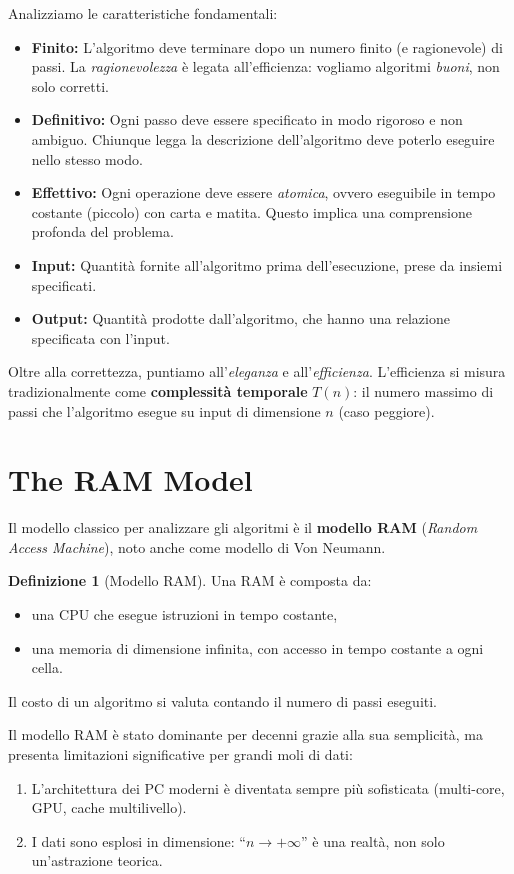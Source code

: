 \documentclass[12pt, a4paper, oneside]{book}
\theoremstyle{plain}
\theoremstyle{definition}
\newtheorem{definizione}[teorema]{Definizione}
\theoremstyle{remark}
\begin{document}
Analizziamo le caratteristiche fondamentali:
\begin{itemize}
  \item \textbf{Finito:} L'algoritmo deve terminare dopo un numero finito (e ragionevole) di passi. La \emph{ragionevolezza} è legata all'efficienza: vogliamo algoritmi \emph{buoni}, non solo corretti.
  \item \textbf{Definitivo:} Ogni passo deve essere specificato in modo rigoroso e non ambiguo. Chiunque legga la descrizione dell'algoritmo deve poterlo eseguire nello stesso modo.
  \item \textbf{Effettivo:} Ogni operazione deve essere \emph{atomica}, ovvero eseguibile in tempo costante (piccolo) con carta e matita. Questo implica una comprensione profonda del problema.
  \item \textbf{Input:} Quantità fornite all'algoritmo prima dell'esecuzione, prese da insiemi specificati.
  \item \textbf{Output:} Quantità prodotte dall'algoritmo, che hanno una relazione specificata con l'input.
\end{itemize}

Oltre alla correttezza, puntiamo all'\emph{eleganza} e all'\emph{efficienza}. L'efficienza si misura tradizionalmente come \textbf{complessità temporale} $T(n)$: il numero massimo di passi che l'algoritmo esegue su input di dimensione $n$ (caso peggiore).

\section{The RAM Model}

Il modello classico per analizzare gli algoritmi è il \textbf{modello RAM} (\emph{Random Access Machine}), noto anche come modello di Von Neumann.

\begin{definizione}[Modello RAM]
Una RAM è composta da:
\begin{itemize}
  \item una CPU che esegue istruzioni in tempo costante,
  \item una memoria di dimensione infinita, con accesso in tempo costante a ogni cella.
\end{itemize}
Il costo di un algoritmo si valuta contando il numero di passi eseguiti.
\end{definizione}

Il modello RAM è stato dominante per decenni grazie alla sua semplicità, ma presenta limitazioni significative per grandi moli di dati:
\begin{enumerate}
  \item L'architettura dei PC moderni è diventata sempre più sofisticata (multi-core, GPU, cache multilivello).
  \item I dati sono esplosi in dimensione: ``$n \to +\infty$'' è una realtà, non solo un'astrazione teorica.
\end{enumerate}
\end{document}
